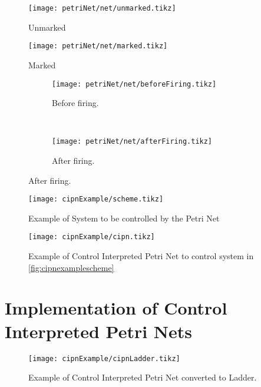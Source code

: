 
\begin{figure}[H]
  \centering
  \texttt{[image: petriNet/net/unmarked.tikz]}
  \caption{Unmarked}
\end{figure}



\begin{figure}[H]
  \centering
  \texttt{[image: petriNet/net/marked.tikz]}
  \caption{Marked}
\end{figure}

\begin{figure}[H]
  \centering
 \begin{subfigure}[t]{0.45\textwidth}
  \centering
  \texttt{[image: petriNet/net/beforeFiring.tikz]}
  \caption{Before firing.}
\end{subfigure}
~
\begin{subfigure}[t]{0.45\textwidth}
  \centering
  \texttt{[image: petriNet/net/afterFiring.tikz]}
  \caption{After firing.}
\end{subfigure}
 
\end{figure}


\begin{figure}[H]
  \centering \texttt{[image: cipnExample/scheme.tikz]}
  \caption[cipnexample]{Example of System to be controlled by the Petri Net}
  \label{fig:cipnexamplescheme}
\end{figure}

\pagebreak
\begin{figure}[H]
  \centering \texttt{[image: cipnExample/cipn.tikz]}
  \caption[cipnexample]{Example of Control Interpreted Petri Net to control
    system in \autoref{fig:cipnexamplescheme}}
  \label{fig:cipnexample}
\end{figure}



\usetikzlibrary{arrows,shapes,circuits.plc.ladder,external}

\section{Implementation of Control Interpreted Petri Nets}
\label{sec:implementPetriNets}
\begin{figure}[H]
  \centering \texttt{[image: cipnExample/cipnLadder.tikz]}
  \caption[cipnexample]{Example of Control Interpreted Petri Net converted to
    Ladder.}
  \label{fig:cipnexampleLadder}
\end{figure}


